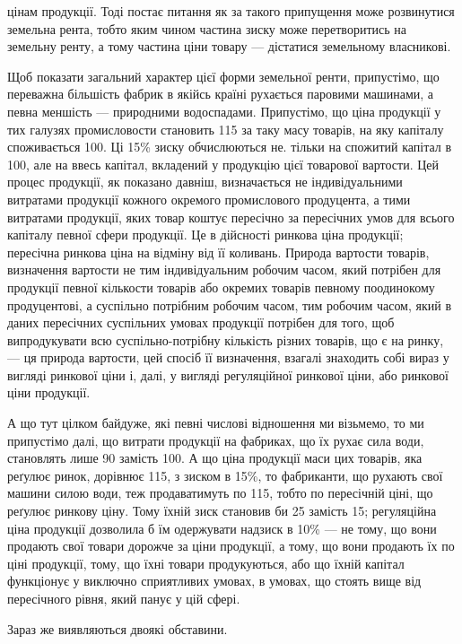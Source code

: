 цінам продукції. Тоді постає питання як за такого припущення може розвинутися
земельна рента, тобто яким чином частина зиску може перетворитись на земельну
ренту, а тому частина ціни товару — дістатися земельному власникові.

Щоб показати загальний характер цієї форми земельної ренти, припустімо,
що переважна більшість фабрик в якійсь країні рухається паровими машинами,
а певна меншість — природними водоспадами. Припустімо, що ціна продукції
у тих галузях промисловости становить 115 за таку масу товарів, на яку капіталу
споживається 100. Ці 15\% зиску обчислюються не. тільки на спожитий капітал
в 100, але на ввесь капітал, вкладений у продукцію цієї товарової вартости.
Цей процес продукції, як показано давніш, визначається не індивідуальними
витратами продукції кожного окремого промислового продуцента, а тими витратами
продукції, яких товар коштує пересічно за пересічних умов для всього капіталу
певної сфери продукції. Це в дійсності ринкова ціна продукції; пересічна ринкова
ціна на відміну від її коливань. Природа вартости товарів, визначення вартости
не тим індивідуальним робочим часом, який потрібен для продукції певної
кількости товарів або окремих товарів певному поодинокому продуцентові, а
суспільно потрібним робочим часом, тим робочим часом, який в даних пересічних
суспільних умовах продукції потрібен для того, щоб випродукувати всю суспільно-потрібну
кількість різних товарів, що є на ринку, — ця природа вартости,
цей спосіб її визначення, взагалі знаходить собі вираз у вигляді ринкової ціни
і, далі, у вигляді регуляційної ринкової ціни, або ринкової ціни продукції.

А що тут цілком байдуже, які певні числові відношення ми візьмемо, то ми
припустімо далі, що витрати продукції на фабриках, що їх рухає сила води,
становлять лише 90 замість 100. А що ціна продукції маси цих товарів, яка
реґулює ринок, дорівнює 115, з зиском в 15\%, то фабриканти, що рухають
свої машини силою води, теж продаватимуть по 115, тобто по пересічній ціні,
що реґулює ринкову ціну. Тому їхній зиск становив би 25 замість 15; регуляційна
ціна продукції дозволила б їм одержувати надзиск в 10\% — не тому, що вони
продають свої товари дорожче за ціни продукції, а тому, що вони продають
їх по ціні продукції, тому, що їхні товари продукуються, або що їхній капітал
функціонує у виключно сприятливих умовах, в умовах, що стоять вище від пересічного
рівня, який панує у цій сфері.

Зараз же виявляються двоякі обставини.

